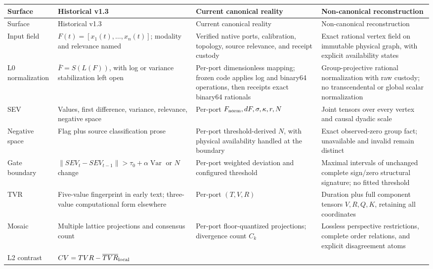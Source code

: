 \documentclass[11pt,oneside]{article}
\begin{document}
\small
\begin{longtable}{
>{\raggedright\arraybackslash}p{}
>{\raggedright\arraybackslash}p{}
>{\raggedright\arraybackslash}p{}
>{\raggedright\arraybackslash}p{}}
\toprule
Surface & Historical v1.3 & Current canonical reality &
Non-canonical reconstruction\\
\midrule
\endfirsthead
\toprule
Surface & Historical v1.3 & Current canonical reality &
Non-canonical reconstruction\\
\midrule
\endhead
Input field &
\(F(t)=[x_1(t),\ldots,x_n(t)]\); modality and relevance named &
Verified native ports, calibration, topology, source relevance, and receipt
custody &
Exact rational vertex field on immutable physical graph, with explicit
availability states\\
\addlinespace
L0 normalization &
\(\bar F=S(L(F))\), with log or variance stabilization left open &
Per-port dimensionless mapping; frozen code applies log and binary64
operations, then receipts exact binary64 rationals &
Group-projective rational normalization with raw custody; no transcendental
or global scalar normalization\\
\addlinespace
SEV &
Values, first difference, variance, relevance, negative space &
Per-port \(F_{\rm norm},dF,\sigma,\kappa,r,N\) &
Joint tensors over every vertex and causal dyadic scale\\
\addlinespace
Negative space &
Flag plus source classification prose &
Per-port threshold-derived \(N\), with physical availability handled at the
boundary &
Exact observed-zero group fact; unavailable and invalid remain distinct\\
\addlinespace
Gate boundary &
\(\|SEV_t-SEV_{t-1}\|>\tau_0+\alpha\operatorname{Var}\) or \(N\) change &
Per-port weighted deviation and configured threshold &
Maximal intervals of unchanged complete sign/zero structural signature;
no fitted threshold\\
\addlinespace
TVR &
Five-value fingerprint in early text; three-value computational form elsewhere &
Per-port \((T,V,R)\) &
Duration plus full component tensors \(V,R,Q,K\), retaining all coordinates\\
\addlinespace
Mosaic &
Multiple lattice projections and consensus count &
Per-port floor-quantized projections; divergence count \(C_k\) &
Lossless perspective restrictions, complete order relations, and explicit
disagreement atoms\\
\addlinespace
L2 contrast &
\(CV=TVR-\overline{TVR}_{\rm local}\) &

\end{longtable}
\end{document}
